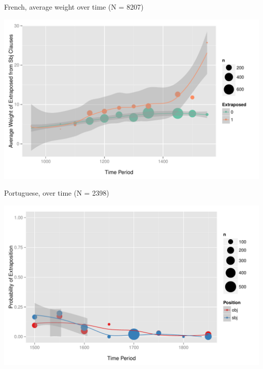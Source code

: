 \documentclass[hyperref={pdfpagelabels=false}]{beamer}
\begin{document}
\begin{frame}{French, average weight over time (N = 8207)}

\begin{center}
\includegraphics[width=1.1\textwidth]{exWeightYearBinned50Loessfre.pdf}
\end{center}
\end{frame}

\begin{frame}{Portuguese, over time (N = 2398)}

\begin{center}
\includegraphics[width=1.1\textwidth]{exSbjObjYearBinned50Loessport.pdf}
\end{center}
\end{frame}
\end{document}
